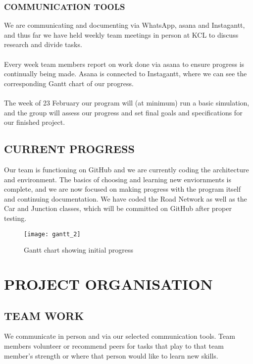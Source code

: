 \documentclass[11pt]{article}
\begin{document}
\subsubsection{COMMUNICATION TOOLS}

We are communicating and documenting via WhatsApp, asana and Instagantt, and thus 
far we have held weekly team meetings in person at KCL to discuss research and divide tasks.
\\ \\
Every week team members report on work done via asana to ensure progress is continually being made. Asana is connected to Instagantt, where we can see the corresponding Gantt chart of our progress.
\\ \\
The week of 23 February our program will (at minimum) run a basic simulation, and the group will assess our progress and set final goals and specifications for our finished project.

\subsection{CURRENT PROGRESS}

Our team is functioning on GitHub and we are currently coding the architecture and 
environment. The basics of choosing and learning new enviornments is complete, and we
are now focused on making progress with the program itself and continuing documentation. 
We have coded the Road Network as well as the Car and Junction classes, which will be committed on GitHub after proper testing.

\newpage

\begin{figure}[h!]
	\caption{Gantt chart showing initial progress}
	\centering
	\texttt{[image: gantt\_2]}
\end{figure}


\section{PROJECT ORGANISATION}

\subsection{TEAM WORK}

We communicate in person and via our selected communication tools.  Team members 
volunteer or recommend peers for tasks that play to that team member's strength or where 
that person would like to learn new skills.
\end{document}
